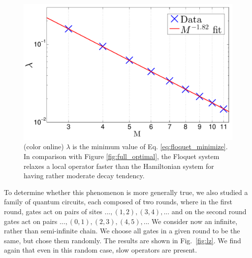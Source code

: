 \documentclass[twocolumn,superscriptaddress, prb]{revtex4-1}
\begin{document}
\begin{figure}
\includegraphics[width=1.0\linewidth]{semi_infinite_floquet_only.pdf}
\centering
\caption{(color online) $\lambda$ is the minimum value of Eq. \eqref{eq:floquet_minimize}. In comparison with Figure \ref{fig:full_optimal}, the Floquet system relaxes a local operator faster than the Hamiltonian system for having rather moderate decay tendency.
}
\label{fig:floquet}
\end{figure}


To determine whether this phenomenon is more generally true, we also studied a family of quantum circuits, each composed of two rounds, where in the first round, gates act on pairs of sites $...,(1,2),(3,4),...$ and on the second round gates act on pairs $...,(0,1),(2,3),(4,5),...$  We consider now an infinite, rather than semi-infinite chain.  We choose all gates in a given round to be the same, but chose them randomly.  The results are shown in Fig.~\ref{fig:lz}.  We find again that even in this random case, slow operators are present.
\end{document}
